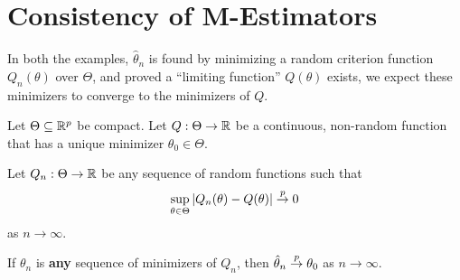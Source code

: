 \section{Consistency of M-Estimators}
\label{sec:cons-m-estim}

In both the examples, $\hat \theta_{n}$ is found by minimizing a
random criterion function $Q_{n}(\theta)$ over $\Theta$, and proved a
``limiting function'' $Q(\theta)$ exists, we expect these minimizers
to converge to the minimizers of $Q$.

\begin{thm}
  \label{defn:parametric_statistical_models:1}
  Let $\Theta \subseteq \mathbb{R}^{p}$ be compact.  Let $Q: \Theta
  \rightarrow \mathbb{R}$ be a continuous, non-random function that has a
  unique minimizer $\theta_{0} \in \Theta$.

  Let $Q_{n}: \Theta \rightarrow \mathbb{R}$ be any sequence of random
  functions such that
  \begin{equation}
    \label{eq:32}
    \sup_{\theta \in \Theta} |Q_{n}(\theta) - Q(\theta)| \overset{p}{\rightarrow} 0
  \end{equation} as $n \rightarrow \infty$.

  If $\theta_{n}$ is \textbf{any} sequence of minimizers of $Q_{n}$,
  then $\hat \theta_{n} \overset{p}{\rightarrow} \theta_{0}$ as $n \rightarrow \infty$.
\end{thm}

